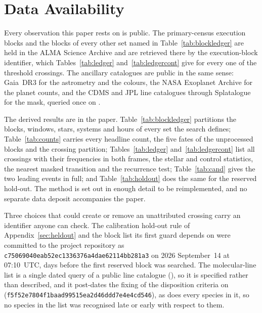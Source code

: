 \section*{Data Availability}
\label{sec:data}
Every observation this paper rests on is public. The \NEB{} primary-census
execution blocks and the blocks of every other set named in
Table~\ref{tab:blockledger} are held in the ALMA Science Archive and are
retrieved there by the execution-block identifier, which
Tables~\ref{tab:ledger} and~\ref{tab:ledgercont} give for every one of the
\EvNCrossRaw{} threshold crossings. The ancillary catalogues are public in the
same sense: Gaia~DR3 for the astrometry and the colours, the NASA Exoplanet
Archive for the planet counts, and the CDMS and JPL line catalogues through
Splatalogue for the mask, queried once on \McQueryDate.

The derived results are in the paper. Table~\ref{tab:blockledger} partitions
the blocks, windows, stars, systems and hours of every set the search defines;
Table~\ref{tab:counts} carries every headline count, the five fates of the
unprocessed blocks and the crossing partition; Tables~\ref{tab:ledger}
and~\ref{tab:ledgercont} list all \EvNCrossRaw{} crossings with their
frequencies in both frames, the stellar and control statistics, the nearest
masked transition and the recurrence test; Table~\ref{tab:cand} gives the two
leading events in full; and Table~\ref{tab:holdout} does the same for the
reserved hold-out. The method is set out in enough detail to be
reimplemented, and no separate data deposit accompanies the paper.

Three choices that could create or remove an unattributed crossing carry an
identifier anyone can check. The
calibration hold-out rule of Appendix~\ref{sec:heldout} and the block list
its first guard depends on were committed to the project repository as
\texttt{c75069040eab52ec1336376a4dae62114bb281a3} on 2026 September~14 at
07:10~UTC, \HoLeadBlockDays{} days before the first reserved block was
searched. The molecular-line list is a single dated query of a public line
catalogue (\McQueryDate), so it is specified rather than
described, and it post-dates the fixing of the disposition criteria on
\MkCritDate{} (\texttt{f5f52e7804f1baad99515ea2d46ddd7e4e4cd546}), as does
every species in it, so no species in the list was recognised late or early
with respect to them.

